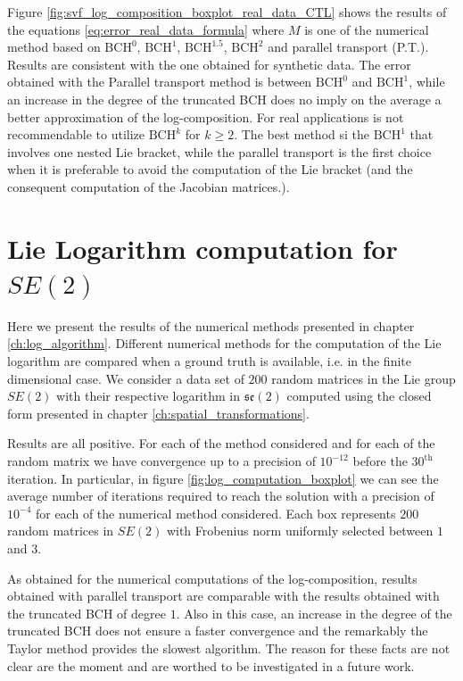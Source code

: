 Figure \ref{fig:svf_log_composition_boxplot_real_data_CTL} shows the results of the equations \ref{eq:error_real_data_formula} where $M$ is one of the numerical method based on $\text{BCH}^0$, $\text{BCH}^1$, $\text{BCH}^{1.5}$, $\text{BCH}^2$ and parallel transport (P.T.). Results are consistent with the one obtained for synthetic data. The error obtained with the Parallel transport method is between $\text{BCH}^0$ and $\text{BCH}^1$, while an increase in the degree of the truncated BCH does no imply on the average a better approximation of the log-composition. For real applications is not recommendable to utilize $\text{BCH}^k$ for $k\geq 2$. The best method si the $\text{BCH}^1$ that involves one nested Lie bracket, while the parallel transport is the first choice when it is preferable to avoid the computation of the Lie bracket (and the consequent computation of the Jacobian matrices.). 



\section{Lie Logarithm computation for $SE(2)$}

Here we present the results of the numerical methods presented in chapter \ref{ch:log_algorithm}. Different numerical methods for the computation of the Lie logarithm are compared when a ground truth is available, i.e. in the finite dimensional case. We consider a data set of $200$ random matrices in the Lie group $SE(2)$ with their respective logarithm in $\mathfrak{se}(2)$ computed using the closed form presented in chapter \ref{ch:spatial_transformations}. 

Results are all positive. For each of the method considered and for each of the random matrix we have convergence up to a precision of $10^{-12}$ before the $30^{\text{th}}$ iteration.
In particular, in figure \ref{fig:log_computation_boxplot} we can see the average number of iterations required to reach the solution with a precision of $10^{-4}$ for each of the numerical method considered. Each box represents $200$ random matrices in $SE(2)$ with Frobenius norm uniformly selected between $1$ and $3$.

As obtained for the numerical computations of the log-composition, results obtained with parallel transport are comparable with the results obtained with the truncated BCH of degree $1$. Also in this case, an increase in the degree of the truncated BCH does not ensure a faster convergence and the remarkably the Taylor method provides the slowest algorithm. The reason for these facts are not clear are the moment and are worthed to be investigated in a future work.

